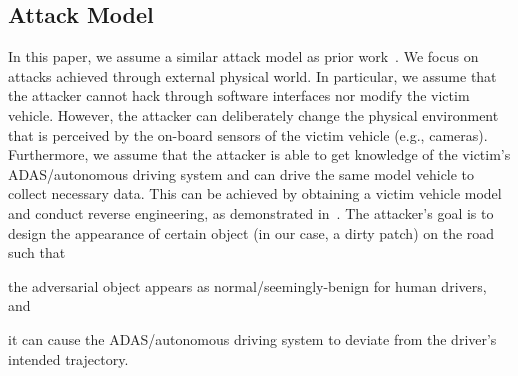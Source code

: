 \subsection{Attack Model %
}
In this paper, we assume a similar attack model as prior work~\cite{sato2020hold}. We focus on  attacks achieved through external physical world. In particular, we assume that the attacker cannot hack through software interfaces nor modify the victim vehicle. However, the attacker can deliberately change the physical environment that is perceived by the on-board sensors of the victim vehicle (e.g., cameras). Furthermore, we assume that the attacker is able to get knowledge of the victim's ADAS/autonomous driving system and can drive the same model vehicle to collect necessary data. This can be achieved by obtaining a victim vehicle model and conduct reverse engineering, as demonstrated in~\cite{tecent2019experimental,checkoway2011comprehensive}.  The attacker's goal is to design the appearance of certain object (in our case, a dirty patch) on the road such that
\begin{enumerate*}
    \item the adversarial object appears as normal/seemingly-benign for human drivers, and
    \item it can cause the ADAS/autonomous driving system to deviate from the driver's intended trajectory.
\end{enumerate*}
